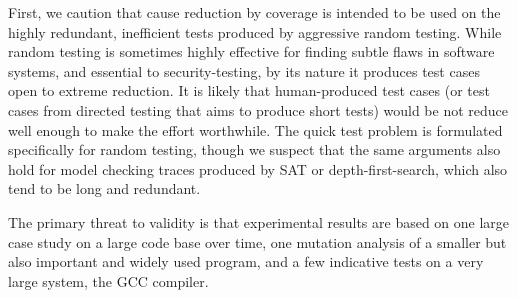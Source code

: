 First, we caution that cause reduction by coverage is intended to be
used on the highly redundant, inefficient tests produced by aggressive
random testing.  While random testing is sometimes highly effective
for finding subtle flaws in software systems, and essential to
security-testing, by its nature it produces test cases open to extreme
reduction.  It is likely that human-produced test cases (or test cases
from directed testing that aims to produce short tests) would be not
reduce well enough to make the effort worthwhile.  The quick test
problem is formulated specifically for random testing, though we
suspect that the same arguments also hold for model checking traces
produced by SAT or depth-first-search, which also tend to be long and
redundant.

The primary threat to validity is that experimental results are based
on one large case study on a large code base over time, one mutation
analysis of a smaller but also important and widely used program, and
a few indicative tests on a very large system, the GCC compiler.

